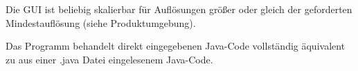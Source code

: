 
Die GUI ist beliebig skalierbar für Auflösungen größer oder gleich der geforderten Mindestauflösung (siehe Produktumgebung).


Das Programm behandelt direkt eingegebenen Java-Code vollständig äquivalent zu aus einer .java Datei eingelesenem Java-Code.
